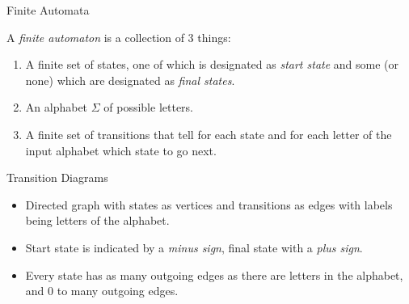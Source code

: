 \documentclass{article}
\begin{document}
\begin{multicols*}{3}
\begin{blackbox}{Finite Automata}
    {\small
    A \emph{finite automaton} is a collection of 3 things: 
    \begin{enumerate}[leftmargin=0.5cm, itemsep=0.1ex]
        \item A finite set of states, one of which is designated as \emph{start state} and some (or none) which are designated as \emph{final states}.
        \item An alphabet $\Sigma$ of possible letters.
        \item A finite set of transitions that tell for each state and for each letter of the input alphabet which state to go next.
    \end{enumerate}
    }
     \begin{bluebox}{Transition Diagrams}
        {\footnotesize
        \begin{itemize}[leftmargin=0.5cm]
            \item Directed graph with states as vertices and transitions as edges with labels being letters of the alphabet.
            \item Start state is indicated by a \emph{minus sign}, final state with a \emph{plus sign}.
            \item Every state has as many outgoing edges as there are letters in the alphabet, and 0 to many outgoing edges.
        \end{itemize}
        }
    \end{bluebox}\\[-2ex]
\end{blackbox}


\end{multicols*}
\end{document}
